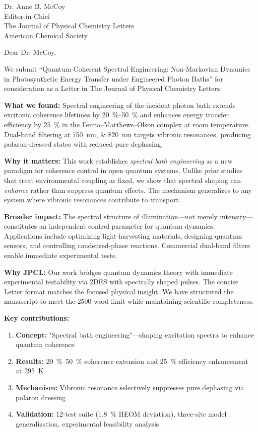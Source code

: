 \documentclass[11pt,a4paper]{letter}
\begin{document}
\begin{letter}{
Dr. Anne B. McCoy\\
Editor-in-Chief\\
The Journal of Physical Chemistry Letters\\
American Chemical Society
}

\opening{Dear Dr. McCoy,}

We submit ``Quantum-Coherent Spectral Engineering: Non-Markovian Dynamics in Photosynthetic Energy Transfer under Engineered Photon Baths'' for consideration as a Letter in The Journal of Physical Chemistry Letters.

\textbf{What we found:} Spectral engineering of the incident photon bath extends excitonic coherence lifetimes by \SIrange{20}{50}{\percent} and enhances energy transfer efficiency by \SI{25}{\percent} in the Fenna--Matthews--Olson complex at room temperature. Dual-band filtering at \SIlist{750;820}{\nano\meter} targets vibronic resonances, producing polaron-dressed states with reduced pure dephasing.

\textbf{Why it matters:} This work establishes \textit{spectral bath engineering} as a new paradigm for coherence control in open quantum systems. Unlike prior studies that treat environmental coupling as fixed, we show that spectral shaping can \textit{enhance} rather than suppress quantum effects. The mechanism generalizes to any system where vibronic resonances contribute to transport.

\textbf{Broader impact:} The spectral structure of illumination---not merely intensity---constitutes an independent control parameter for quantum dynamics. Applications include optimizing light-harvesting materials, designing quantum sensors, and controlling condensed-phase reactions. Commercial dual-band filters enable immediate experimental tests.

\textbf{Why JPCL:} Our work bridges quantum dynamics theory with immediate experimental testability via 2DES with spectrally shaped pulses. The concise Letter format matches the focused physical insight. We have structured the manuscript to meet the \num{2500}-word limit while maintaining scientific completeness.

\textbf{Key contributions:}
\begin{enumerate}
\item \textbf{Concept:} "Spectral bath engineering"---shaping excitation spectra to enhance quantum coherence
\item \textbf{Results:} \SIrange{20}{50}{\percent} coherence extension and \SI{25}{\percent} efficiency enhancement at \SI{295}{\kelvin}
\item \textbf{Mechanism:} Vibronic resonance selectively suppresses pure dephasing via polaron dressing
\item \textbf{Validation:} 12-test suite (\SI{1.8}{\percent} HEOM deviation), three-site model generalization, experimental feasibility analysis
\end{enumerate}


\end{letter}
\end{document}
